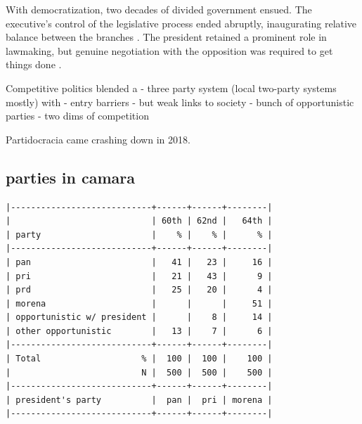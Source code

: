 \documentclass[letter,12pt]{article}
\begin{document}

With democratization, two decades of divided government ensued. The executive's control of the legislative process ended abruptly, inaugurating relative balance between the branches \citep{weldon.1997,lujambio.segl.2000}. The president retained a prominent role in lawmaking, but genuine negotiation with the opposition was required to get things done \citep{casarSinMay2013,bejarQuienLegisla2012}. 


Competitive politics blended a
- three party system (local two-party systems mostly) with 
- entry barriers
- but weak links to society
- bunch of opportunistic parties
- two dims of competition

Partidocracia came crashing down in 2018.

  \subsection{parties in camara}

\singlespacing
\begin{footnotesize}
\begin{verbatim}
|----------------------------+------+------+--------|
|                            | 60th | 62nd |   64th |
| party                      |    % |    % |      % |
|----------------------------+------+------+--------|
| pan                        |   41 |   23 |     16 |
| pri                        |   21 |   43 |      9 |
| prd                        |   25 |   20 |      4 |
| morena                     |      |      |     51 |
| opportunistic w/ president |      |    8 |     14 |
| other opportunistic        |   13 |    7 |      6 |
|----------------------------+------+------+--------|
| Total                    % |  100 |  100 |    100 |
|                          N |  500 |  500 |    500 |
|----------------------------+------+------+--------|
| president's party          |  pan |  pri | morena |
|----------------------------+------+------+--------|
\end{verbatim}
\end{footnotesize}
\doublespacing
\end{document}
